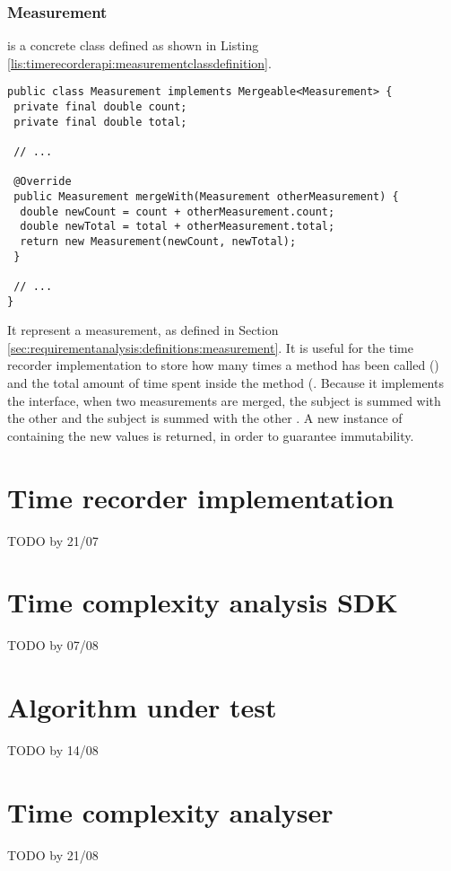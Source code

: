 \subsubsection{Measurement}

 is a concrete class defined as shown in Listing \ref{lis:timerecorderapi:measurementclassdefinition}.

\begin{lstlisting}[breaklines,caption={Measurement class definition},label=lis:timerecorderapi:measurementclassdefinition]
public class Measurement implements Mergeable<Measurement> {
 private final double count;
 private final double total;

 // ...

 @Override
 public Measurement mergeWith(Measurement otherMeasurement) {
  double newCount = count + otherMeasurement.count;
  double newTotal = total + otherMeasurement.total;
  return new Measurement(newCount, newTotal);
 }

 // ...
}
\end{lstlisting}

\noindent It represent a measurement, as defined in Section \ref{sec:requirementanalysis:definitions:measurement}. It is useful for the time recorder implementation to store how many times a method has been called () and the total amount of time spent inside the method (. Because it implements the  interface, when two measurements are merged, the subject  is summed with the other  and the subject  is summed with the other . A new instance of  containing the new values is returned, in order to guarantee immutability.

\section{Time recorder implementation}
\label{sec:implementation:timerecorderimplementation}

TODO by 21/07


\section{Time complexity analysis SDK}

TODO by 07/08


\section{Algorithm under test}

TODO by 14/08


\section{Time complexity analyser}
\label{sec:implementation:timecomplexityanalyser} 
TODO by 21/08
